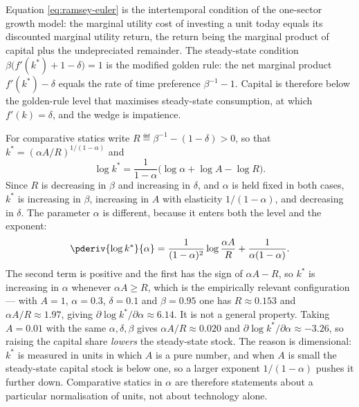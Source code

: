 Equation \eqref{eq:ramsey-euler} is the intertemporal condition of the
one-sector growth model: the marginal utility cost of investing a unit today
equals its discounted marginal utility return, the return being the marginal
product of capital plus the undepreciated remainder. The steady-state condition
$\beta\bigl(f'(k^{\ast})+1-\delta\bigr)=1$ is the modified golden rule: the net
marginal product $f'(k^{\ast})-\delta$ equals the rate of time preference
$\beta^{-1}-1$. Capital is therefore below the golden-rule level that maximises
steady-state consumption, at which $f'(k)=\delta$, and the wedge is impatience.

For comparative statics write $R\eqdef\beta^{-1}-(1-\delta)>0$, so that
$k^{\ast}=(\alpha A/R)^{1/(1-\alpha)}$ and
\[
	\log k^{\ast}=\frac{1}{1-\alpha}\bigl(\log\alpha+\log A-\log R\bigr).
\]
Since $R$ is decreasing in $\beta$ and increasing in $\delta$, and $\alpha$ is
held fixed in both cases, $k^{\ast}$ is increasing in $\beta$, increasing in $A$
with elasticity $1/(1-\alpha)$, and decreasing in $\delta$. The parameter
$\alpha$ is different, because it enters both the level and the exponent:
\begin{equation}\label{eq:ramsey-alpha}
	\pderiv{\log k^{\ast}}{\alpha}
	=\frac{1}{(1-\alpha)^{2}}\log\frac{\alpha A}{R}+\frac{1}{\alpha(1-\alpha)} .
\end{equation}
The second term is positive and the first has the sign of $\alpha A-R$, so
$k^{\ast}$ is increasing in $\alpha$ whenever $\alpha A\geq R$, which is the
empirically relevant configuration --- with $A=1$, $\alpha=0.3$, $\delta=0.1$ and
$\beta=0.95$ one has $R\approx0.153$ and $\alpha A/R\approx1.97$, giving
$\partial\log k^{\ast}/\partial\alpha\approx6.14$. It is not a general property.
Taking $A=0.01$ with the same $\alpha,\delta,\beta$ gives $\alpha A/R\approx0.020$
and $\partial\log k^{\ast}/\partial\alpha\approx-3.26$, so raising the capital
share \emph{lowers} the steady-state stock. The reason is dimensional: $k^{\ast}$
is measured in units in which $A$ is a pure number, and when $A$ is small the
steady-state capital stock is below one, so a larger exponent $1/(1-\alpha)$
pushes it further down. Comparative statics in $\alpha$ are therefore statements
about a particular normalisation of units, not about technology alone.


